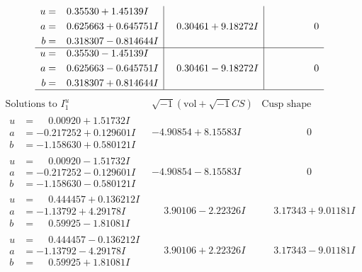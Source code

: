 \documentclass[1p]{elsarticle_modified}
\theoremstyle{definition}
\newcommand{\I}{\sqrt{-1}}
\begin{document}
$$\begin{array}{c|c|c}
\begin{aligned}
u &= \phantom{-}0.35530 + 1.45139 I \\
a &= \phantom{-}0.625663 + 0.645751 I \\
b &= \phantom{-}0.318307 - 0.814644 I\end{aligned}
 & \phantom{-}0.30461 + 9.18272 I & \phantom{-0.000000 } 0 \\ \hline\begin{aligned}
u &= \phantom{-}0.35530 - 1.45139 I \\
a &= \phantom{-}0.625663 - 0.645751 I \\
b &= \phantom{-}0.318307 + 0.814644 I\end{aligned}
 & \phantom{-}0.30461 - 9.18272 I & \phantom{-0.000000 } 0\\
 \hline 
 \end{array}$$\newpage$$\begin{array}{c|c|c}  
\text{Solutions to }I^u_{1}& \I (\text{vol} + \sqrt{-1}CS) & \text{Cusp shape}\\
 \hline 
\begin{aligned}
u &= \phantom{-}0.00920 + 1.51732 I \\
a &= -0.217252 + 0.129601 I \\
b &= -1.158630 + 0.580121 I\end{aligned}
 & -4.90854 + 8.15583 I & \phantom{-0.000000 } 0 \\ \hline\begin{aligned}
u &= \phantom{-}0.00920 - 1.51732 I \\
a &= -0.217252 - 0.129601 I \\
b &= -1.158630 - 0.580121 I\end{aligned}
 & -4.90854 - 8.15583 I & \phantom{-0.000000 } 0 \\ \hline\begin{aligned}
u &= \phantom{-}0.444457 + 0.136212 I \\
a &= -1.13792 + 4.29178 I \\
b &= \phantom{-}0.59925 - 1.81081 I\end{aligned}
 & \phantom{-}3.90106 - 2.22326 I & \phantom{-}3.17343 + 9.01181 I \\ \hline\begin{aligned}
u &= \phantom{-}0.444457 - 0.136212 I \\
a &= -1.13792 - 4.29178 I \\
b &= \phantom{-}0.59925 + 1.81081 I\end{aligned}
 & \phantom{-}3.90106 + 2.22326 I & \phantom{-}3.17343 - 9.01181 I \\ \hline\begin{aligned}

\end{aligned}
\end{array}$$
\end{document}
